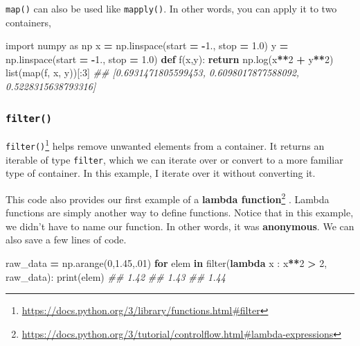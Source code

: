 \documentclass[
  12pt,
  krantz2]{krantz}
\makeatletter
\newenvironment{Shaded}{\begin{snugshade}}{\end{snugshade}}
\newcommand{\BuiltInTok}[1]{#1}
\newcommand{\CommentTok}[1]{\textcolor[rgb]{0.37,0.37,0.37}{\textit{#1}}}
\newcommand{\ControlFlowTok}[1]{\textcolor[rgb]{0.27,0.27,0.27}{\textbf{#1}}}
\newcommand{\DecValTok}[1]{\textcolor[rgb]{0.06,0.06,0.06}{#1}}
\newcommand{\FloatTok}[1]{\textcolor[rgb]{0.06,0.06,0.06}{#1}}
\newcommand{\ImportTok}[1]{#1}
\newcommand{\KeywordTok}[1]{\textcolor[rgb]{0.27,0.27,0.27}{\textbf{#1}}}
\newcommand{\NormalTok}[1]{#1}
\newcommand{\OperatorTok}[1]{\textcolor[rgb]{0.43,0.43,0.43}{\textbf{#1}}}
\renewcommand{\href}[2]{#2\footnote{\url{#1}}}
\newenvironment{kframe}{%
\medskip{}
\setlength{\fboxsep}{.8em}
 \def\at@end@of@kframe{}%
 \ifinner\ifhmode%
  \def\at@end@of@kframe{\end{minipage}}%
  \begin{minipage}{\columnwidth}%
 \fi\fi%
 \def\FrameCommand##1{\hskip\@totalleftmargin \hskip-\fboxsep
 \colorbox{shadecolor}{##1}\hskip-\fboxsep
     \hskip-\linewidth \hskip-\@totalleftmargin \hskip\columnwidth}%
 \MakeFramed {\advance\hsize-\width
   \@totalleftmargin\z@ \linewidth\hsize
   \@setminipage}}%
 {\par\unskip\endMakeFramed%
 \at@end@of@kframe}
\renewenvironment{Shaded}{\begin{kframe}}{\end{kframe}}
\makeatother
\begin{document}
\texttt{map()} can also be used like \texttt{mapply()}. In other words, you can apply it to two containers,

\begin{Shaded}
\begin{Highlighting}[]
\ImportTok{import}\NormalTok{ numpy }\ImportTok{as}\NormalTok{ np}
\NormalTok{x }\OperatorTok{=}\NormalTok{ np.linspace(start }\OperatorTok{=} \OperatorTok{{-}}\FloatTok{1.}\NormalTok{, stop }\OperatorTok{=} \FloatTok{1.0}\NormalTok{)}
\NormalTok{y }\OperatorTok{=}\NormalTok{ np.linspace(start }\OperatorTok{=} \OperatorTok{{-}}\FloatTok{1.}\NormalTok{, stop }\OperatorTok{=} \FloatTok{1.0}\NormalTok{)}
\KeywordTok{def}\NormalTok{ f(x,y):}
    \ControlFlowTok{return}\NormalTok{ np.log(x}\OperatorTok{**}\DecValTok{2} \OperatorTok{+}\NormalTok{ y}\OperatorTok{**}\DecValTok{2}\NormalTok{)}
\BuiltInTok{list}\NormalTok{(}\BuiltInTok{map}\NormalTok{(f, x, y))[:}\DecValTok{3}\NormalTok{]}
\CommentTok{\#\# [0.6931471805599453, 0.6098017877588092, 0.5228315638793316]}
\end{Highlighting}
\end{Shaded}

\hypertarget{filter}{%
\subsubsection{\texorpdfstring{\texttt{filter()}}{filter()}}\label{filter}}

\href{https://docs.python.org/3/library/functions.html\#filter}{\texttt{filter()}} helps remove unwanted elements from a container. It returns an iterable of type \texttt{filter}, which we can iterate over or convert to a more familiar type of container. In this example, I iterate over it without converting it.

This code also provides our first example of a \href{https://docs.python.org/3/tutorial/controlflow.html\#lambda-expressions}{\textbf{lambda function}} \citep{Lutz13}. Lambda functions are simply another way to define functions. Notice that in this example, we didn't have to name our function. In other words, it was \textbf{anonymous}. We can also save a few lines of code.

\begin{Shaded}
\begin{Highlighting}[]
\NormalTok{raw\_data }\OperatorTok{=}\NormalTok{ np.arange(}\DecValTok{0}\NormalTok{,}\FloatTok{1.45}\NormalTok{,}\FloatTok{.01}\NormalTok{)}
\ControlFlowTok{for}\NormalTok{ elem }\KeywordTok{in} \BuiltInTok{filter}\NormalTok{(}\KeywordTok{lambda}\NormalTok{ x : x}\OperatorTok{**}\DecValTok{2} \OperatorTok{\textgreater{}} \DecValTok{2}\NormalTok{, raw\_data):}
    \BuiltInTok{print}\NormalTok{(elem)}
\CommentTok{\#\# 1.42}
\CommentTok{\#\# 1.43}
\CommentTok{\#\# 1.44}
\end{Highlighting}
\end{Shaded}
\end{document}
